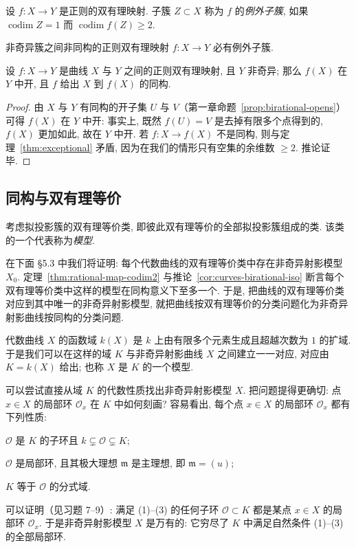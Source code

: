 \begin{definition}[例外子簇]\label{def:exceptional}
	设 $f: X \to Y$ 是正则的双有理映射. 子簇 $Z \subset X$ 称为 $f$ 的\emph{例外子簇}, 如果 $\operatorname{codim} Z = 1$ 而 $\operatorname{codim} f(Z) \ge 2$.
\end{definition}

\begin{corollary}\label{cor:exceptional-exists}
	非奇异簇之间非同构的正则双有理映射 $f: X \to Y$ 必有例外子簇.
\end{corollary}

\begin{corollary}\label{cor:curve-open-iso}
	设 $f: X \to Y$ 是曲线 $X$ 与 $Y$ 之间的正则双有理映射, 且 $Y$ 非奇异; 那么 $f(X)$ 在 $Y$ 中开, 且 $f$ 给出 $X$ 到 $f(X)$ 的同构.
\end{corollary}

\begin{proof}
	由 $X$ 与 $Y$ 有同构的开子集 $U$ 与 $V$（第一章命题~\ref{prop:birational-opens}）可得 $f(X)$ 在 $Y$ 中开: 事实上, 既然 $f(U) = V$ 是去掉有限多个点得到的, $f(X)$ 更加如此, 故在 $Y$ 中开. 若 $f: X \to f(X)$ 不是同构, 则与定理~\ref{thm:exceptional} 矛盾, 因为在我们的情形只有空集的余维数 $\ge 2$. 推论证毕.
\end{proof}

\subsection{同构与双有理等价}

考虑拟投影簇的双有理等价类, 即彼此双有理等价的全部拟投影簇组成的类. 该类的一个代表称为\emph{模型}.

在下面 §5.3 中我们将证明: 每个代数曲线的双有理等价类中存在非奇异射影模型 $X_0$. 定理~\ref{thm:rational-map-codim2} 与推论~\ref{cor:curves-birational-iso} 断言每个双有理等价类中这样的模型在同构意义下至多一个. 于是, 把曲线的双有理等价类对应到其中唯一的非奇异射影模型, 就把曲线按双有理等价的分类问题化为非奇异射影曲线按同构的分类问题.

代数曲线 $X$ 的函数域 $k(X)$ 是 $k$ 上由有限多个元素生成且超越次数为 $1$ 的扩域. 于是我们可以在这样的域 $K$ 与非奇异射影曲线 $X$ 之间建立一一对应, 对应由 $K = k(X)$ 给出; 也称 $X$ 是 $K$ 的一个模型.

可以尝试直接从域 $K$ 的代数性质找出非奇异射影模型 $X$. 把问题提得更确切: 点 $x \in X$ 的局部环 $\mathcal O_x$ 在 $K$ 中如何刻画? 容易看出, 每个点 $x \in X$ 的局部环 $\mathcal O_x$ 都有下列性质:
\begin{compactenum}[(1)]
	\item $\mathcal O$ 是 $K$ 的子环且 $k \subsetneq \mathcal O \subsetneq K$;
	\item $\mathcal O$ 是局部环, 且其极大理想 $\mathfrak m$ 是主理想, 即 $\mathfrak m = (u)$;
	\item $K$ 等于 $\mathcal O$ 的分式域.
\end{compactenum}
可以证明（见习题 7--9）: 满足 (1)--(3) 的任何子环 $\mathcal O \subset K$ 都是某点 $x \in X$ 的局部环 $\mathcal O_x$. 于是非奇异射影模型 $X$ 是万有的: 它穷尽了 $K$ 中满足自然条件 (1)--(3) 的全部局部环.

